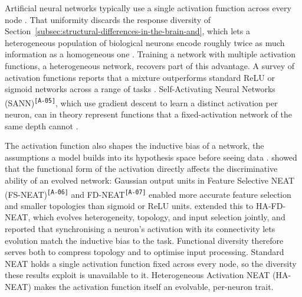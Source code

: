 \documentclass[12pt]{article}
\newcommand{\revID}[1]{\textsuperscript{\scriptsize\texttt{[#1]}}}
\newcommand{\revAcro}[2]{\textcolor{lrPurple}{#2}\revID{#1}}    %
\begin{document}
Artificial neural networks typically use a single activation function across every node \parencite{dubey_activation_2022}.
That uniformity discards the response diversity of Section~\ref{subsec:structural-differences-in-the-brain-and}, which lets a heterogeneous population of biological neurons encode roughly twice as much information as a homogeneous one \parencite{padmanabhan_intrinsic_2010}.
Training a network with multiple activation functions, a heterogeneous network, recovers part of this advantage.
A survey of activation functions reports that a mixture outperforms standard ReLU or sigmoid networks across a range of tasks \parencite{dubey_activation_2022}. \revAcro{A-05}{Self-Activating Neural Networks (SANN)}, which use gradient descent to learn a distinct activation per neuron, can in theory represent functions that a fixed-activation network of the same depth cannot \parencite{tutuncuoglu_neuronlevel_2025}.

The activation function also shapes the inductive bias of a network, the assumptions a model builds into its hypothesis space before seeing data \parencite{papavasileiou_importance_2017}.
\textcite{papavasileiou_importance_2017} showed that the functional form of the activation directly affects the discriminative ability of an evolved network: Gaussian output units in \revAcro{A-06}{Feature Selective NEAT (FS-NEAT)} and \revAcro{A-07}{FD-NEAT} enabled more accurate feature selection and smaller topologies than sigmoid or ReLU units.
\textcite{papavasileiou_optimizing_2022} extended this to HA-FD-NEAT, which evolves heterogeneity, topology, and input selection jointly, and reported that synchronising a neuron's activation with its connectivity lets evolution match the inductive bias to the task.
Functional diversity therefore serves both to compress topology and to optimise input processing.
Standard NEAT holds a single activation function fixed across every node, so the diversity these results exploit is unavailable to it.
Heterogeneous Activation NEAT (HA-NEAT) makes the activation function itself an evolvable, per-neuron trait.




\end{document}
